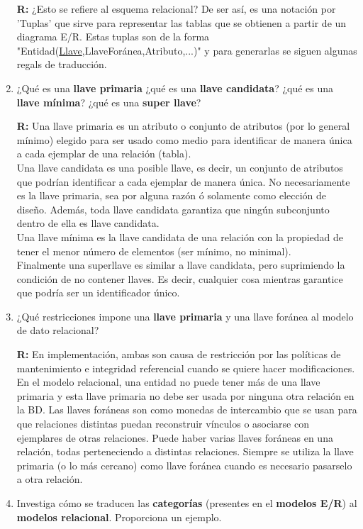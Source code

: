 \documentclass{article}
\begin{document}
\begin{enumerate}[label = \alph*.]
            \textbf{R: }{¿Esto se refiere al esquema relacional? De ser así,
            es una notación por 'Tuplas' que sirve para representar las 
            tablas que se obtienen a partir de un diagrama E/R. Estas tuplas
            son de la forma "Entidad(\underline{Llave},LlaveForánea,Atributo,...)"
            y para generarlas se siguen algunas regals de traducción.}
        \item ¿Qué es una \textbf{llave primaria} ¿qué es una \textbf{llave 
        candidata}? ¿qué es una \textbf{llave mínima}? ¿qué es una \textbf{super
        llave}?
        
            \textbf{R: }{Una llave primaria es un atributo o conjunto de atributos 
            (por lo general mínimo) elegido para ser usado como medio para 
            identificar de manera única a cada ejemplar de una relación (tabla).\\
            Una llave candidata es una posible llave, es decir, un conjunto de 
            atributos que podrían identificar a cada ejemplar de manera única. 
            No necesariamente es la llave primaria, sea por alguna razón ó 
            solamente como elección de diseño. Además, toda llave candidata garantiza
            que ningún subconjunto dentro de ella es llave candidata.\\
            Una llave mínima es la llave candidata de una relación con la propiedad
            de tener el menor número de elementos (ser mínimo, no minimal).\\
            Finalmente una superllave es similar a llave candidata, pero suprimiendo
            la condición de no contener llaves. Es decir, cualquier cosa mientras
            garantice que podría ser un identificador único.}
        \item ¿Qué restricciones impone una \textbf{llave primaria} y una llave 
        foránea al modelo de dato relacional?
        
            \textbf{R: }{En implementación, ambas son causa de restricción por las
            políticas de mantenimiento e integridad referencial cuando se quiere 
            hacer modificaciones. En el modelo relacional, una entidad no puede 
            tener más de una llave primaria y esta llave primaria no debe ser usada
            por ninguna otra relación en la BD. Las llaves foráneas son como monedas
            de intercambio que se usan para que relaciones distintas puedan reconstruir
            vínculos o asociarse con ejemplares de otras relaciones. Puede haber varias
            llaves foráneas en una relación, todas perteneciendo a distintas relaciones.
            Siempre se utiliza la llave primaria (o lo más cercano) como llave foránea
            cuando es necesario pasarselo a otra relación.}
        \item Investiga cómo se traducen las \textbf{categorías} (presentes en
        el \textbf{modelos E/R}) al \textbf{modelos relacional}. Proporciona un 
        ejemplo.
    \end{enumerate}
\end{document}
